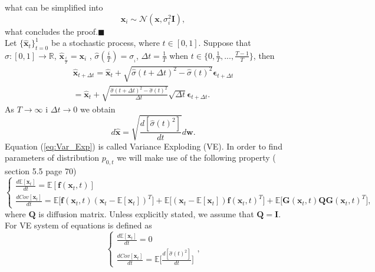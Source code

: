 \documentclass[10pt]{article}
\begin{document}
what can be simplified into
\begin{equation}
      \textbf{x}_i \sim \mathcal{N} ( \textbf{x},\sigma_{i}^2  \mathbf{I} ),
\end{equation}
what concludes the proof.$\blacksquare$ \\
Let  $\{ \hat{\textbf{x}}_t \}_{t=0}^1$ be a stochastic process, where $t \in [0,1]$. Suppose that  
  $\hat{\sigma}:[0, 1] \to \mathbb{R}$, $\hat{\textbf{x}}_{\frac{i}{T}} =\textbf{x}_{i}$ , 
  $\hat{\sigma}(\frac{i}{T})  = \sigma__{i}$,  $\Delta t = \frac{1}{T}$ when  $t \in \{0, \frac{1}{T}, ..., \frac{T-1}{T}\}$,
then
\begin{gather}
     \hat{\textbf{x}}_{t + \Delta t} = \hat{\textbf{x}}_{t} + 
     \sqrt{\hat{\sigma}(t + \Delta t)^2 - \hat{\sigma}(t)^2} \bm{\epsilon}_{t + \Delta t}\\
     = \hat{\textbf{x}}_{t} + \sqrt{\frac{\hat{\sigma}(t + \Delta t)^2 - \hat{\sigma}(t)^2 }{\Delta t}}
     \sqrt{\Delta t} \bm{\epsilon}_{t + \Delta t}.
\end{gather}
As $T \to \infty$ i $\Delta t \to 0$ we obtain
\begin{equation}
\label{eq:Var_Exp}
    d \hat{\textbf{x}} = \sqrt{ \frac{d [ \hat{\sigma}(t)^2]}{dt} } d \textbf{w}.
\end{equation}
Equation (\ref{eq:Var_Exp}) is called Variance Exploding (VE). In order to find parameters of distribution $p_{0,t}$ we will make use of the following property ( \cite{Särkkä_Solin_2019} section 5.5 page 70)
\begin{equation} \label{eq:sarkka}
    \begin{cases}
      \frac{d \mathbb{E}[\textbf{x}_t] }{dt} = \mathbb{E}[\textbf{f}(\textbf{x}_t, t) ]\\
       \frac{d Cov[\textbf{x}_t] }{dt} = \mathbb{E}\Big[\textbf{f}(\textbf{x}_t, t) (\textbf{x}_t -\mathbb{E}[\textbf{x}_t]  )^T \Big] + \mathbb{E} \Big[ (\textbf{x}_t -\mathbb{E}[\textbf{x}_t]  )\textbf{f}(\textbf{x}_t, t)^T \Big] 
       + \mathbb{E} \Big[ \textbf{G}(\textbf{x}_t, t)  \textbf{Q} \textbf{G}(\textbf{x}_t, t)^T \Big],
    \end{cases}\,
\end{equation}
where $\textbf{Q} $ is diffusion matrix. Unless explicitly stated, we assume that
$\textbf{Q} = \mathbf{I}$.\\
For VE  system of equations is defined as 
\begin{equation}
    \begin{cases}
      \frac{d \mathbb{E}[\textbf{x}_t] }{dt} = 0\\
       \frac{d Cov[\textbf{x}_t] }{dt} =  
       \mathbb{E} \Big[ \frac{d [ \hat{\sigma}(t)^2]}{dt}\Big] 
    \end{cases},
\end{equation}
\end{document}
